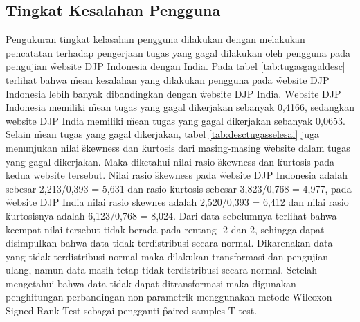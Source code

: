 \subsection{Tingkat Kesalahan Pengguna}
Pengukuran tingkat kelasahan pengguna dilakukan dengan melakukan pencatatan terhadap pengerjaan tugas yang gagal dilakukan oleh pengguna pada pengujian \f{website} DJP Indonesia dengan India. Pada tabel \ref{tab:tugasgagaldesc} terlihat bahwa \f{mean} kesalahan yang dilakukan pengguna pada \f{website} DJP Indonesia lebih banyak dibandingkan dengan \f{website} DJP India. \f{Website} DJP Indonesia memiliki \f{mean} tugas yang gagal dikerjakan sebanyak 0,4166, sedangkan website DJP India memiliki \f{mean} tugas yang gagal dikerjakan sebanyak 0,0653. Selain \f{mean} tugas yang gagal dikerjakan, tabel \ref{tab:desctugasselesai} juga menunjukan nilai \f{skewness} dan \f{kurtosis} dari masing-masing \f{website} dalam tugas yang gagal dikerjakan. Maka diketahui nilai rasio \f{skewness} dan \f{kurtosis} pada kedua \f{website} tersebut. Nilai rasio \f{skewness} pada \f{website} DJP Indonesia adalah sebesar 2,213/0,393 = 5,631 dan rasio \f{kurtosis} sebesar 3,823/0,768 = 4,977, pada \f{website} DJP India nilai rasio skewnes adalah 2,520/0,393 = 6,412 dan nilai rasio \f{kurtosis}nya adalah 6,123/0,768 = 8,024. Dari data sebelumnya terlihat bahwa keempat nilai tersebut tidak berada pada rentang -2 dan 2, sehingga dapat disimpulkan bahwa data tidak terdistribusi secara normal. Dikarenakan data yang tidak terdistribusi normal maka dilakukan transformasi dan pengujian ulang, namun data masih tetap tidak terdistribusi secara normal. Setelah mengetahui bahwa data tidak dapat ditransformasi maka digunakan penghitungan perbandingan non-parametrik menggunakan metode \f{Wilcoxon Signed Rank Test} sebagai pengganti \f{paired samples T-test}.
